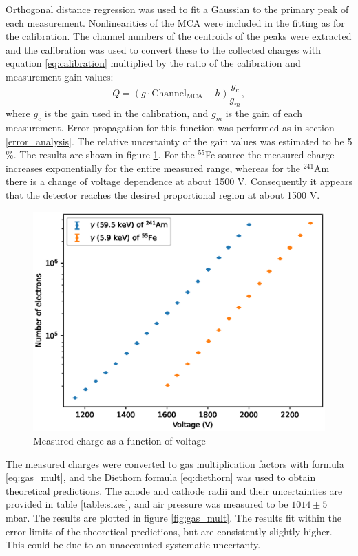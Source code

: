 \documentclass[a4paper]{article}
\begin{document}
\FloatBarrier

Orthogonal distance regression was used to fit a Gaussian to the primary peak of each measurement.
Nonlinearities of the MCA were included in the fitting as for the calibration.
The channel numbers of the centroids of the peaks were extracted and the calibration was used to convert these to the collected charges with equation \ref{eq:calibration} multiplied by the ratio of the calibration and measurement gain values:
\begin{equation}
Q = (g \cdot \text{Channel}_\text{MCA} + h) \frac{g_c}{g_m},
\end{equation}
where $g_c$ is the gain used in the calibration, and $g_m$ is the gain of each measurement.
Error propagation for this function was performed as in section \ref{error_analysis}.
The relative uncertainty of the gain values was estimated to be 5 \%.
The results are shown in figure \ref{fig:hv_scans}.
For the $^{55}$Fe source the measured charge increases exponentially for the entire measured range, whereas for the $^{241}$Am there is a change of voltage dependence at about 1500 V.
Consequently it appears that the detector reaches the desired proportional region at about 1500 V.

\begin{figure}[ht!]
\centering
\includegraphics[width=\textwidth]{fig/python/hv_scans.eps}
\caption{Measured charge as a function of voltage}
\label{fig:hv_scans}
\end{figure}

\FloatBarrier
The measured charges were converted to gas multiplication factors with formula \ref{eq:gas_mult}, and the Diethorn formula \ref{eq:diethorn} was used to obtain theoretical predictions.
The anode and cathode radii and their uncertainties are provided in table \ref{table:sizes}, and air pressure was measured to be $1014 \pm 5$ mbar.
The results are plotted in figure \ref{fig:gas_mult}.
The results fit within the error limits of the theoretical predictions, but are consistently slightly higher.
This could be due to an unaccounted systematic uncertanty.
\end{document}
